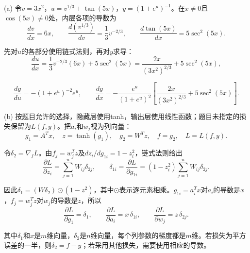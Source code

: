 (a) 令\(v=3x^2\)，\(u=v^{1/3}+\tan(5x)\)，\(y=(1+e^u)^{-1}\)。在\(x\ne0\)且\(\cos(5x)\ne0\)处，内层各项的导数为
\[
\frac{dv}{dx}=6x,\qquad
\frac{d(v^{1/3})}{dv}=\frac13v^{-2/3},\qquad
\frac{d\tan(5x)}{dx}=5\sec^2(5x).
\]


先对\(u\)的各部分使用链式法则，再对\(y\)求导：
\[
\frac{du}{dx}=\frac13v^{-2/3}(6x)+5\sec^2(5x)
=\frac{2x}{(3x^2)^{2/3}}+5\sec^2(5x),
\]



\[
\frac{dy}{du}=-(1+e^u)^{-2}e^u,
\qquad
\frac{dy}{dx}=-\frac{e^u}{(1+e^u)^2}
\left[\frac{2x}{(3x^2)^{2/3}}+5\sec^2(5x)\right].
\]


(b) 按题目允许的选择，隐藏层使用tanh，输出层使用线性函数；题目未指定的损失保留为\(L(f,y)\)。把\(a_i\)和\(w_j\)视为列向量：
\[
g_1=A^Tx,\quad z=\tanh(g_1),\quad
g_2=W^Tz,\quad f=g_2,\quad L=L(f,y).
\]


令\(\delta_2=\nabla_f L\)。由\(f_j=w_j^Tz\)及\(dz_i/dg_{1i}=1-z_i^2\)，链式法则给出
\[
\frac{\partial L}{\partial z_i}=\sum_{j=1}^n W_{ij}\delta_{2j},\qquad
\delta_{1i}=\frac{\partial L}{\partial g_{1i}}
=(1-z_i^2)\sum_{j=1}^n W_{ij}\delta_{2j}.
\]


因此\(\delta_1=(W\delta_2)\odot(1-z^2)\)，其中\(\odot\)表示逐元素相乘。\(g_{1i}=a_i^Tx\)对\(a_i\)的导数是\(x\)，\(f_j=w_j^Tz\)对\(w_j\)的导数是\(z\)，所以
\[
\frac{\partial L}{\partial g_1}=\delta_1,\qquad
\frac{\partial L}{\partial a_i}=x\,\delta_{1i},\qquad
\frac{\partial L}{\partial w_j}=z\,\delta_{2j}.
\]


其中\(\delta_1\)和\(x\)是\(m\)维向量，\(\delta_2\)是\(n\)维向量，每个列参数的梯度都是\(m\)维。若损失为平方误差的一半，则\(\delta_2=f-y\)；若采用其他损失，需要使用相应的导数。

